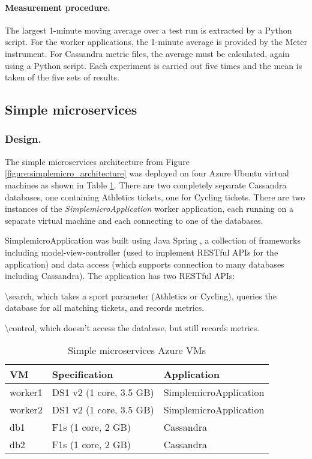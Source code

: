 \paragraph{Measurement procedure.} The largest 1-minute moving average over a test run is extracted by a Python script.  For the worker applications, the 1-minute average is provided by the Meter instrument.  For Cassandra metric files, the average must be calculated, again using a Python script.  Each experiment is carried out five times and the mean is taken of the five sets of results.

%
%
\FloatBarrier
\subsection{Simple microservices}

\subsubsection{Design.}  The simple microservices architecture from Figure \ref{figure:simplemicro_architecture} was deployed on four Azure Ubuntu virtual machines as shown in Table \ref{table:builtmicro_vmdesign}.  There are two completely separate Cassandra databases, one containing Athletics tickets, one for Cycling tickets.  There are two instances of the {\itshape SimplemicroApplication} worker application, each running on a separate virtual machine and each connecting to one of the databases.

SimplemicroApplication was built using Java Spring \cite{RN1076}, a collection of frameworks including model-view-controller (used to implement RESTful APIs for the application) and data access (which supports connection to many databases including Cassandra).  The application has two RESTful APIs:

{\textbackslash search}, which takes a sport parameter (Athletics or Cycling), queries the database for all matching tickets, and records metrics.

{\textbackslash control}, which doesn't access the database, but still records metrics.

\begin{table}[h!]
	\begin{center}
		\caption{Simple microservices Azure VMs}
		\label{table:builtmicro_vmdesign}
		\begin{tabular}{l | l | l}
			VM		& Specification		& Application \\
			\hline
			worker1	& DS1 v2 (1 core, 3.5 GB)	& SimplemicroApplication \\
			worker2	& DS1 v2 (1 core, 3.5 GB)	& SimplemicroApplication \\
			db1		& F1s (1 core, 2 GB)	& Cassandra \\
			db2		& F1s (1 core, 2 GB)	& Cassandra \\
		\end{tabular}
	\end{center}
\end{table}

